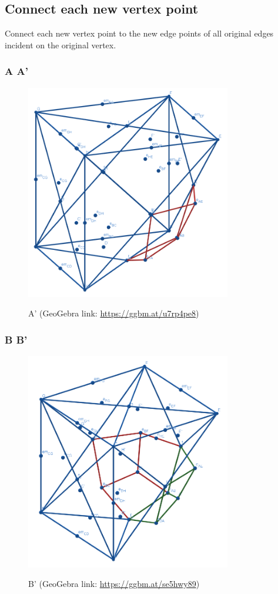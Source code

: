 \documentclass{article}
\begin{document}
\subsection{Connect each new vertex point}
Connect each new vertex point to the new edge points of all original edges incident on the original vertex.
\subsubsection{A \rightarrow A'}
\begin{figure}[H]
\caption{A' (GeoGebra link: \href{https://ggbm.at/u7rp4pe8}{https://ggbm.at/u7rp4pe8})}
\centering
\includegraphics[width=0.8\textwidth]{images/cl-07-1.png}
\label{fig:cube7-1}
\end{figure}
\subsubsection{B \rightarrow B'}
\begin{figure}[H]
\caption{B' (GeoGebra link: \href{https://ggbm.at/se5hwy89}{https://ggbm.at/se5hwy89})}
\centering
\includegraphics[width=0.8\textwidth]{images/cl-07-2.png}
\label{fig:cube7-2}
\end{figure}
\end{document}
